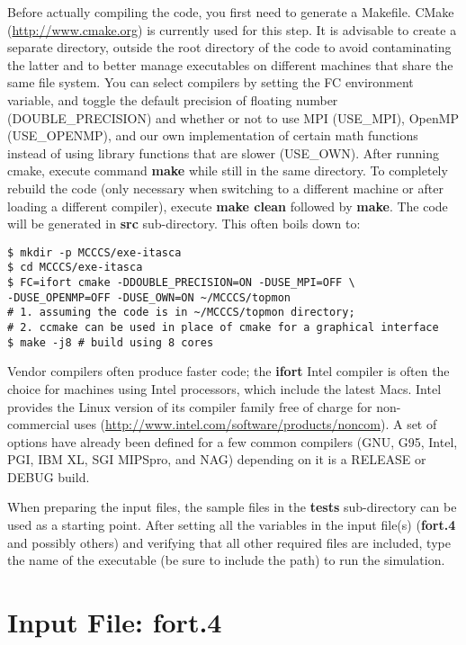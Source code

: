 \documentclass[12pt,letterpaper]{article}
\begin{document}
\noindent Before actually compiling the code, you first need to generate a Makefile. CMake (\url{http://www.cmake.org}) is currently used for this step. It is advisable to create a separate directory, outside the root directory of the code to avoid contaminating the latter and to better manage executables on different machines that share the same file system. You can select compilers by setting the FC environment variable, and toggle the default precision of floating number (DOUBLE\_PRECISION) and whether or not to use MPI (USE\_MPI), OpenMP (USE\_OPENMP), and our own implementation of certain math functions instead of using library functions that are slower (USE\_OWN). After running cmake, execute command {\textbf{make}} while still in the same directory. To completely rebuild the code (only necessary when switching to a different machine or after loading a different compiler), execute {\textbf{make clean}} followed by {\textbf{make}}. The code will be generated in {\bf src} sub-directory. This often boils down to:
\begin{verbatim}
$ mkdir -p MCCCS/exe-itasca
$ cd MCCCS/exe-itasca
$ FC=ifort cmake -DDOUBLE_PRECISION=ON -DUSE_MPI=OFF \
-DUSE_OPENMP=OFF -DUSE_OWN=ON ~/MCCCS/topmon
# 1. assuming the code is in ~/MCCCS/topmon directory;
# 2. ccmake can be used in place of cmake for a graphical interface
$ make -j8 # build using 8 cores
\end{verbatim}

\noindent Vendor compilers often produce faster code; the {\bf ifort} Intel compiler is often the choice for machines using Intel processors, which include the latest Macs. Intel provides the Linux version of its compiler family free of charge for non-commercial uses (\url{http://www.intel.com/software/products/noncom}). A set of options have already been defined for a few common compilers (GNU, G95, Intel, PGI, IBM XL, SGI MIPSpro, and NAG) depending on it is a RELEASE or DEBUG build.

\noindent When preparing the input files, the sample files in the {\bf tests} sub-directory can be used as a starting point. After setting all the variables in the input file(s) ({\bf fort.4} and possibly others) and verifying that all other required files are included, type the name of the executable (be sure to include the path) to run the simulation.

\newpage

\section{Input File: {\textbf{fort.4}}}
\end{document}
